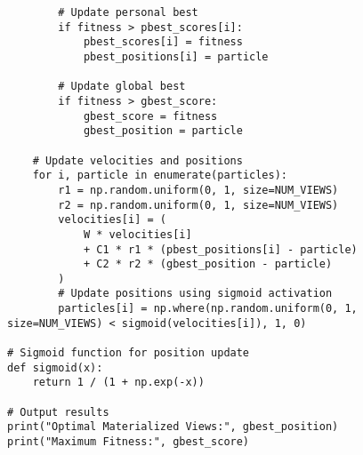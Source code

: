 \begin{verbatim}
        # Update personal best
        if fitness > pbest_scores[i]:
            pbest_scores[i] = fitness
            pbest_positions[i] = particle

        # Update global best
        if fitness > gbest_score:
            gbest_score = fitness
            gbest_position = particle

    # Update velocities and positions
    for i, particle in enumerate(particles):
        r1 = np.random.uniform(0, 1, size=NUM_VIEWS)
        r2 = np.random.uniform(0, 1, size=NUM_VIEWS)
        velocities[i] = (
            W * velocities[i]
            + C1 * r1 * (pbest_positions[i] - particle)
            + C2 * r2 * (gbest_position - particle)
        )
        # Update positions using sigmoid activation
        particles[i] = np.where(np.random.uniform(0, 1, size=NUM_VIEWS) < sigmoid(velocities[i]), 1, 0)

# Sigmoid function for position update
def sigmoid(x):
    return 1 / (1 + np.exp(-x))

# Output results
print("Optimal Materialized Views:", gbest_position)
print("Maximum Fitness:", gbest_score)
\end{verbatim}
